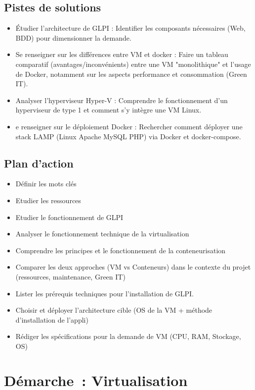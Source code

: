 \subsection*{Pistes de solutions}
{}
\begin{itemize}
  \item Étudier l'architecture de GLPI : Identifier les composants nécessaires (Web, BDD) pour dimensionner la demande.
  \item Se renseigner sur les différences entre VM et docker : Faire un tableau comparatif (avantages/inconvénients) entre une VM "monolithique" et l'usage de Docker, notamment sur les aspects performance et consommation (Green IT).
  \item Analyser l'hyperviseur Hyper-V : Comprendre le fonctionnement d'un hyperviseur de type 1 et comment s'y intègre une VM Linux.
  \item e renseigner sur le déploiement Docker : Rechercher comment déployer une stack LAMP (Linux Apache MySQL PHP) via Docker et docker-compose.
\end{itemize}

\subsection*{Plan d'action}
{}
\begin{itemize}
  \item Définir les mots clés
  \item Etudier les ressources
  \item Etudier le fonctionnement de GLPI
  \item Analyser le fonctionnement technique de la virtualisation
  \item Comprendre les principes et le fonctionnement de la conteneurisation
  \item Comparer les deux approches (VM vs Conteneurs) dans le contexte du projet (ressources, maintenance, Green IT)
  \item Lister les prérequis techniques pour l'installation de GLPI.
  \item Choisir et déployer l'architecture cible (OS de la VM + méthode d'installation de l'appli)
  \item Rédiger les spécifications pour la demande de VM (CPU, RAM, Stockage, OS)
\end{itemize}

\section*{Démarche~: Virtualisation}

